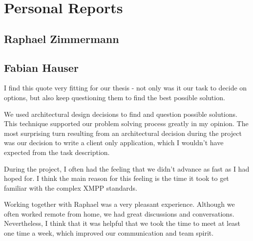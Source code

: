 \section{Personal Reports}\label{sec:personal-reports}

\subsection{Raphael Zimmermann}

\subsection{Fabian Hauser}

%
I find this quote very fitting for our thesis - not only was it our task to decide on options,
but also keep questioning them to find the best possible solution.

We used architectural design decisions to find and question possible solutions.
This technique supported our problem solving process greatly in my opinion.
The most surprising turn resulting from an architectural decision during the project was our decision to write a client only application,
which I wouldn't have expected from the task description.

During the project, I often had the feeling that we didn't advance as fast as I had hoped for.
I think the main reason for this feeling is the time it took to get familiar with the complex XMPP standards.

Working together with Raphael was a very pleasant experience.
Although we often worked remote from home, we had great discussions and conversations.
Nevertheless, I think that it was helpful that we took the time to meet at least one time a week, which improved our communication and team spirit.
